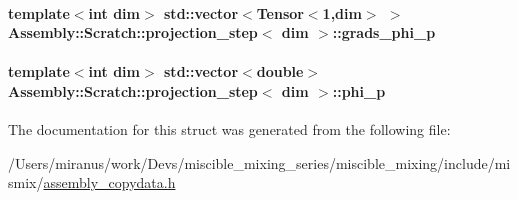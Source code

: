 \paragraph[{grads\+\_\+phi\+\_\+p}]{\setlength{\rightskip}{0pt plus 5cm}template$<$int dim$>$ std\+::vector$<$Tensor$<$1,dim$>$ $>$ {\bf Assembly\+::\+Scratch\+::projection\+\_\+step}$<$ dim $>$\+::grads\+\_\+phi\+\_\+p}\label{struct_assembly_1_1_scratch_1_1projection__step_a75ecf1c6d8aa564824cc3b3376ca08f9}
\hypertarget{struct_assembly_1_1_scratch_1_1projection__step_a766727128326d33ecd414c713f186540}{}
\paragraph[{phi\+\_\+p}]{\setlength{\rightskip}{0pt plus 5cm}template$<$int dim$>$ std\+::vector$<$double$>$ {\bf Assembly\+::\+Scratch\+::projection\+\_\+step}$<$ dim $>$\+::phi\+\_\+p}\label{struct_assembly_1_1_scratch_1_1projection__step_a766727128326d33ecd414c713f186540}


The documentation for this struct was generated from the following file\+:\begin{DoxyCompactItemize}
\item 
/\+Users/miranus/work/\+Devs/miscible\+\_\+mixing\+\_\+series/miscible\+\_\+mixing/include/mismix/\hyperlink{assembly__copydata_8h}{assembly\+\_\+copydata.\+h}\end{DoxyCompactItemize}
